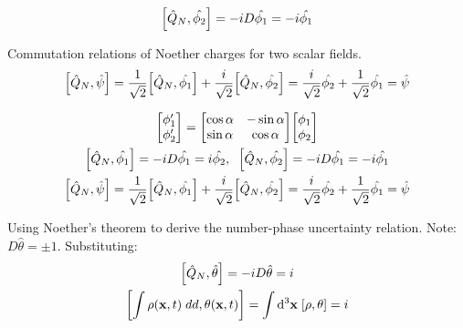 \documentclass{report}
\begin{document}
\begin{subquests}
\begin{subquests}
		\item
		\begin{gather*}
			\bqty{\hat{Q}_N, \hat{\phi_2}} = -iD\hat{\phi_1} = -i\hat{\phi_1}
		\end{gather*}
		
		\item Commutation relations of Noether charges for two scalar fields.
		\begin{gather*}
			\bqty{\hat{Q}_N, \hat{\psi}} = \frac{1}{\sqrt{2}}\bqty{\hat{Q}_N, \hat{\phi_1}} + \frac{i}{\sqrt{2}}\bqty{\hat{Q}_N, \hat{\phi_2}} = \frac{i}{\sqrt{2}}\hat{\phi_2} + \frac{1}{\sqrt{2}}\hat{\phi_1} = \hat{\psi}
		\end{gather*}
	\end{subquests}
	\begin{gather*}
		\mqty[
			\phi_1' \\
			\phi_2' 
		]
		= \mqty[
			\cos\alpha & -\sin\alpha \\
			\sin\alpha & \cos\alpha \\
		]\mqty[
			\phi_1 \\
			\phi_2
		] \\
		\bqty{\hat{Q}_N, \hat{\phi_1}} = -iD\hat{\phi_1} = i\hat{\phi_2},\;\;\bqty{\hat{Q}_N, \hat{\phi_2}} = -iD\hat{\phi_1} = -i\hat{\phi_1} \\
		\bqty{\hat{Q}_N, \hat{\psi}} = \frac{1}{\sqrt{2}}\bqty{\hat{Q}_N, \hat{\phi_1}} + \frac{i}{\sqrt{2}}\bqty{\hat{Q}_N, \hat{\phi_2}} = \frac{i}{\sqrt{2}}\hat{\phi_2} + \frac{1}{\sqrt{2}}\hat{\phi_1} = \hat{\psi}
	\end{gather*}

	\item Using Noether's theorem to derive the number-phase uncertainty relation.
	Note: $D\hat{\theta} = \pm 1$. Substituting:
	\begin{gather*}
		\bqty{\hat{Q}_N, \hat{\theta}} = -iD\hat{\theta} = i \\
		\bqty{\int\rho({\vb x},t)\; dd, \theta({\vb x},t)} = \int\dd^3{\vb x}\;\bqty{\rho,\theta} = i
	\end{gather*}


\end{subquests}
\end{document}
